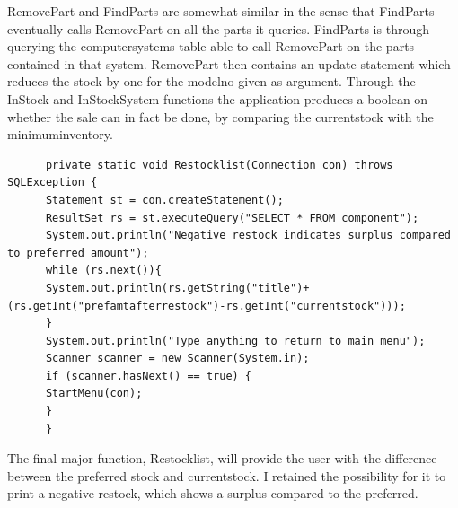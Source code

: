 \documentclass[a4paper,10pt]{article}
\begin{document}
RemovePart and FindParts are somewhat similar in the sense that FindParts eventually calls RemovePart on all the parts it queries. FindParts is through querying the computersystems table able to call RemovePart on the parts contained in that system. RemovePart then contains an update-statement which reduces the stock by one for the modelno given as argument. Through the InStock and InStockSystem functions the application produces a boolean on whether the sale can in fact be done, by comparing the currentstock with the minimuminventory. 

\begin{lstlisting}
	  private static void Restocklist(Connection con) throws SQLException {
	  Statement st = con.createStatement();
	  ResultSet rs = st.executeQuery("SELECT * FROM component");
	  System.out.println("Negative restock indicates surplus compared to preferred amount");
	  while (rs.next()){
	  System.out.println(rs.getString("title")+(rs.getInt("prefamtafterrestock")-rs.getInt("currentstock")));
	  }
	  System.out.println("Type anything to return to main menu");
	  Scanner scanner = new Scanner(System.in);
	  if (scanner.hasNext() == true) {
	  StartMenu(con);
	  }
	  }
\end{lstlisting}
The final major function, Restocklist, will provide the user with the difference between the preferred stock and currentstock. I retained the possibility for it to print a negative restock, which shows a surplus compared to the preferred.
\end{document}
